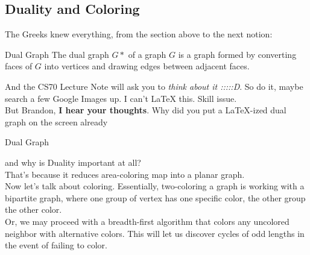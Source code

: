 \subsection{Duality and Coloring}
The Greeks knew everything, from the section above to the next notion:
\begin{ln-define}{Dual Graph}{}
    The dual graph $G*$ of a graph $G$ is a graph formed by converting faces of $G$ into vertices and drawing edges between adjacent faces.
\end{ln-define}
And the CS70 Lecture Note will ask you to \textit{think about it :::::D}. So do it, maybe search a few Google Images up. I can't LaTeX this. Skill issue. \\
But Brandon, \textbf{I hear your thoughts}. Why did you put a LaTeX-ized dual graph on the screen already
\begin{ln-fig}{Dual Graph}{}
    \begin{center}
    \end{center}
\end{ln-fig}
and why is Duality important at all? \\
That's because it reduces area-coloring map into a planar graph. \\
Now let's talk about coloring. Essentially, two-coloring a graph is working with a bipartite graph, where one group of vertex has one specific color, the other group the other color. \\
Or, we may proceed with a breadth-first algorithm that colors any uncolored neighbor with alternative colors. This will let us discover cycles of odd lengths in the event of failing to color.

